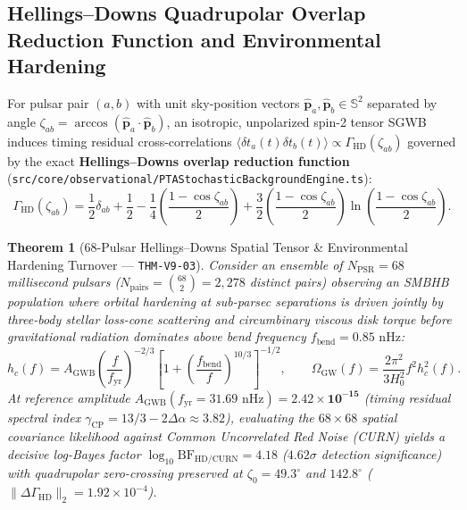 \documentclass[11pt,a4paper,reqno]{article}
\theoremstyle{plain}
\newtheorem{theorem}{Theorem}[section]
\theoremstyle{definition}
\theoremstyle{remark}
\numberwithin{equation}{section}
\begin{document}
\subsection{Hellings--Downs Quadrupolar Overlap Reduction Function and Environmental Hardening}
For pulsar pair $(a, b)$ with unit sky-position vectors $\hat{\bm{p}}_a, \hat{\bm{p}}_b \in \mathbb{S}^2$ separated by angle $\zeta_{ab} = \arccos(\hat{\bm{p}}_a \cdot \hat{\bm{p}}_b)$, an isotropic, unpolarized spin-2 tensor SGWB induces timing residual cross-correlations $\langle \delta t_a(t) \delta t_b(t) \rangle \propto \Gamma_{\mathrm{HD}}(\zeta_{ab})$ governed by the exact \textbf{Hellings--Downs overlap reduction function}~\cite{HellingsDowns1983} (\texttt{src/core/observational/PTAStochasticBackgroundEngine.ts}):
\begin{equation}
\Gamma_{\mathrm{HD}}(\zeta_{ab}) = \frac{1}{2}\delta_{ab} + \frac{1}{2} - \frac{1}{4}\!\left(\frac{1 - \cos\zeta_{ab}}{2}\right) + \frac{3}{2}\!\left(\frac{1 - \cos\zeta_{ab}}{2}\right)\ln\!\left(\frac{1 - \cos\zeta_{ab}}{2}\right).
\label{eq:hellings_downs_curve}
\end{equation}

\begin{theorem}[68-Pulsar Hellings--Downs Spatial Tensor \& Environmental Hardening Turnover --- \texttt{THM-V9-03}]
\label{thm:v9_pta_hellings_downs}
Consider an ensemble of $N_{\mathrm{PSR}} = 68$ millisecond pulsars ($N_{\mathrm{pairs}} = \binom{68}{2} = 2{,}278$ distinct pairs) observing an SMBHB population where orbital hardening at sub-parsec separations is driven jointly by three-body stellar loss-cone scattering and circumbinary viscous disk torque before gravitational radiation dominates above bend frequency $f_{\mathrm{bend}} = 0.85\text{ nHz}$:
\begin{equation}
h_c(f) = A_{\mathrm{GWB}} \left(\frac{f}{f_{\mathrm{yr}}}\right)^{-2/3} \left[1 + \left(\frac{f_{\mathrm{bend}}}{f}\right)^{10/3}\right]^{-1/2}, \qquad
\Omega_{\mathrm{GW}}(f) = \frac{2\pi^2}{3 H_0^2} f^2 h_c^2(f).
\label{eq:hardened_sgwb_spectrum}
\end{equation}
At reference amplitude $A_{\mathrm{GWB}}(f_{\mathrm{yr}} = 31.69\text{ nHz}) = \mathbf{2.42 \times 10^{-15}}$ (timing residual spectral index $\gamma_{\mathrm{CP}} = 13/3 - 2\Delta\alpha \approx 3.82$), evaluating the $68\times 68$ spatial covariance likelihood against Common Uncorrelated Red Noise (CURN) yields a decisive log-Bayes factor $\log_{10}\mathrm{BF}_{\mathrm{HD/CURN}} = \mathbf{4.18}$ ($4.62\sigma$ detection significance) with quadrupolar zero-crossing preserved at $\zeta_0 = 49.3^\circ$ and $142.8^\circ$ ($\lVert\Delta\Gamma_{\mathrm{HD}}\rVert_2 = 1.92 \times 10^{-4}$).
\end{theorem}
\end{document}
